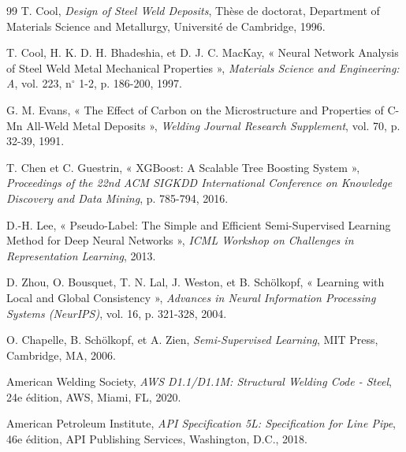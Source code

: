 \documentclass[11pt,a4paper]{article}
\begin{document}
\begin{thebibliography}{99}
T. Cool, \textit{Design of Steel Weld Deposits}, Thèse de doctorat, Department of Materials Science and Metallurgy, Université de Cambridge, 1996.

T. Cool, H. K. D. H. Bhadeshia, et D. J. C. MacKay, « Neural Network Analysis of Steel Weld Metal Mechanical Properties », \textit{Materials Science and Engineering: A}, vol. 223, n$^\circ$ 1-2, p. 186-200, 1997.

G. M. Evans, « The Effect of Carbon on the Microstructure and Properties of C-Mn All-Weld Metal Deposits », \textit{Welding Journal Research Supplement}, vol. 70, p. 32-39, 1991.

T. Chen et C. Guestrin, « XGBoost: A Scalable Tree Boosting System », \textit{Proceedings of the 22nd ACM SIGKDD International Conference on Knowledge Discovery and Data Mining}, p. 785-794, 2016.

D.-H. Lee, « Pseudo-Label: The Simple and Efficient Semi-Supervised Learning Method for Deep Neural Networks », \textit{ICML Workshop on Challenges in Representation Learning}, 2013.

D. Zhou, O. Bousquet, T. N. Lal, J. Weston, et B. Schölkopf, « Learning with Local and Global Consistency », \textit{Advances in Neural Information Processing Systems (NeurIPS)}, vol. 16, p. 321-328, 2004.

O. Chapelle, B. Schölkopf, et A. Zien, \textit{Semi-Supervised Learning}, MIT Press, Cambridge, MA, 2006.

American Welding Society, \textit{AWS D1.1/D1.1M: Structural Welding Code - Steel}, 24e édition, AWS, Miami, FL, 2020.

American Petroleum Institute, \textit{API Specification 5L: Specification for Line Pipe}, 46e édition, API Publishing Services, Washington, D.C., 2018.
\end{thebibliography}
\end{document}

